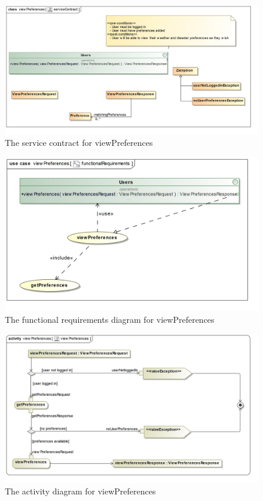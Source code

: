 \begin{figure}[H]
	\centering
	\includegraphics[scale=0.2]{../images/funcReq/viewPreferencesServiceContract.jpg}
	\caption{The service contract for viewPreferences \label{overflow}}
\end{figure}

\begin{figure}[H]
	\centering
	\includegraphics[width=1.1\textwidth]{../images/funcReq/viewPreferencesFunctionalRequirements.jpg}
	\caption{The functional requirements diagram for viewPreferences \label{overflow}}
\end{figure}

\begin{figure}[H]
	\centering
	\includegraphics[scale=0.22]{../images/funcReq/viewPreferencesActivityDiagram.jpg}
	\caption{The activity diagram for viewPreferences \label{overflow}}
\end{figure}